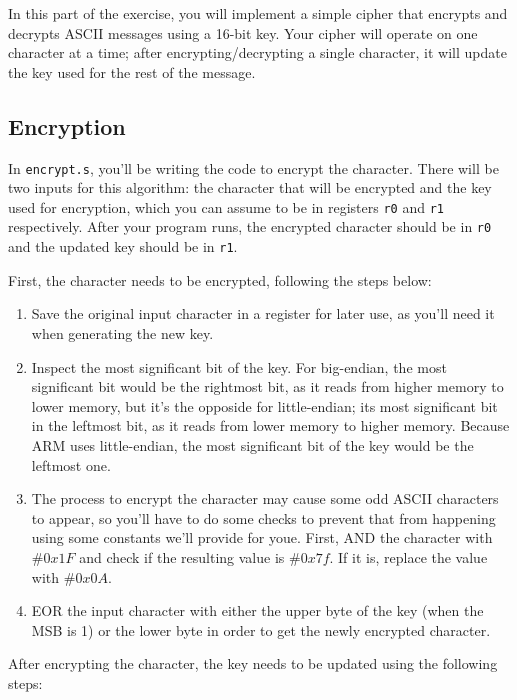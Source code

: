 \documentclass{article}
\def\r#1{\texttt{r#1}}
\begin{document}
In this part of the exercise, you will implement a simple cipher that
encrypts and decrypts ASCII messages using a 16-bit key. Your cipher
will operate on one character at a time; after encrypting/decrypting a
single character, it will update the key used for the rest of the
message.

\subsection{Encryption}

In \texttt{encrypt.s}, you'll be writing the code to encrypt the character.
There will be two inputs for this algorithm: the character that will be 
encrypted and the key used for encryption, which you can assume to be 
in registers \r{0} and \r{1} respectively. After your program runs, the 
encrypted character should be in \r{0} and the updated key should be in \r{1}.

First, the character needs to be encrypted, following the steps below:

\begin{enumerate} \item Save the original input character in a register for 
later use, as you'll need it when generating the new key.
\item Inspect the most significant bit of the key. For big-endian, the 
most significant bit would be the rightmost bit, as it reads from higher 
memory to lower memory, but it's the opposide for little-endian; its 
most significant bit in the leftmost bit, as it reads from lower memory to 
higher memory. Because ARM uses little-endian, the most significant bit of 
the key would be the leftmost one.  
\item The process to encrypt the character may cause some odd ASCII
characters to appear, so you'll have to do some checks to prevent that from
happening using some constants we'll provide for youe. First, AND the 
character with $\#0x1F$ and check if the resulting value is $\#0x7f$. If it is,
replace the value with $\#0x0A$.
\item EOR the input character with either the upper byte of the key (when
the MSB is 1) or the lower byte in order to get the newly encrypted character.
\end{enumerate}

After encrypting the character, the key needs to be updated using the 
following steps:
\end{document}
